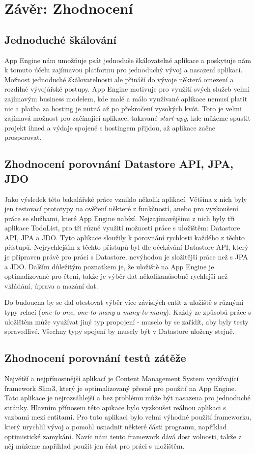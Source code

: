 \chapter{Závěr: Zhodnocení}

\section{Jednoduché škálování}
App Engine nám umožňuje psát jednoduše škálovatelné aplikace a poskytuje nám k tomuto účelu zajímavou platformu pro jednoduchý vývoj a nasazení aplikací. Možnost jednoduché škálovatelnosti ale přináší do vývoje některá omezení a rozdílné vývojářské postupy. App Engine motivuje pro využití svých služeb velmi zajímavým business modelem, kde malé a málo využívané aplikace nemusí platit nic a platba za hosting je nutná až po překročení vysokých kvót. Toto je velmi zajímavá možnost pro začínající aplikace, takzvané \emph{start-upy}, kde můžeme spustit projekt ihned a výdaje spojené s hostingem přijdou, až aplikace začne prosperovat.

\section{Zhodnocení porovnání Datastore API, JPA, JDO}
Jako výsledek této bakalářské práce vzniklo několik aplikací. Většina z nich byly jen testovací prototypy na ověření některé z funkčností, anebo pro vyzkoušení práce se službami, které App Engine nabízí. Nejzajímavějšími z nich byly tři aplikace TodoList, pro tři různé využití možnosti práce s uložištěm: Datastore API, JPA a JDO. Tyto aplikace sloužily k porovnání rychlosti každého z těchto přístupů. Nejrychlejším z těchto přístupů byl dle očekávání Datastore API, který je připraven právě pro práci s Datastore, nevýhodou je složitější práce než s JPA a JDO. Dalším důležitým poznatkem je, že uložiště na App Engine je optimalizované pro čtení, takže je výběr dat několikanásobně rychlejší než vkládání, úprava a mazání dat.

Do budoucna by se dal otestovat výběr více závislých entit z uložiště s různými typy relací (\emph{one-to-one}, \emph{one-to-many} a \emph{many-to-many}). Každý ze způsobů práce s uložištěm může využívat jiný typ propojení - muselo by se zařídít, aby byly testy spravedlivé. Všechny typy spojení by musely být v Datastore uloženy stejně.

\section{Zhodnocení porovnání testů zátěže}
Největší a nejpřínostnější aplikací je Content Management System využívající framework Slim3, který je optimalizovaný přesně pro použití na App Engine. Tato aplikace je nejrozsáhlejší a bez problému může být nasazena pro jednoduché stránky. Hlavním přínosem této apikace bylo vyzkoušet reálnou aplikaci s vazbami mezi entitami. Pro tuto aplikaci bylo velmi výhodné použití frameworku, který urychlil vývoj a pomohl usnadnit některé části programu, například optimistické zamykání. Navíc nám tento framework dává dost volnosti, takže z něj můžeme například použít jen část pro práci s uložištěm. 

